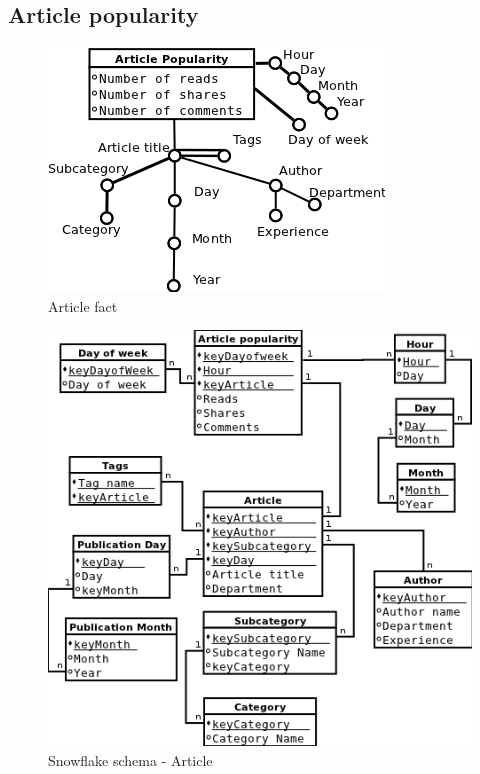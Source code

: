 \subsection*{Article popularity} 

\begin{figure}[!hbp]
  \includegraphics[scale=0.5]{fact_article}
\caption{\label{pic:f_art}  Article fact}
\end{figure}


\begin{figure}[!hbp]
    \includegraphics[scale=0.5]{schema_snowflake_article}
\caption{\label{pic:sn_art} Snowflake schema - Article}
\end{figure}

